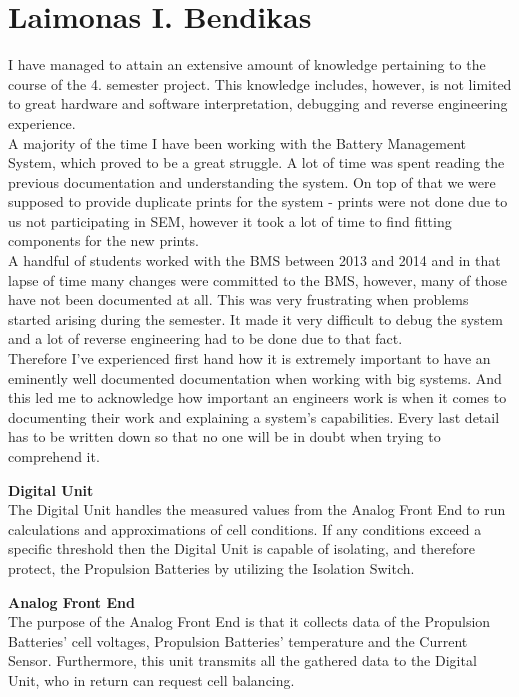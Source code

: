\section{Laimonas I. Bendikas}
I have managed to attain an extensive amount of knowledge pertaining to the course of the 4. semester project. This knowledge includes, however, is not limited to great hardware and software interpretation, debugging and reverse engineering experience.\\
A majority of the time I have been working with the Battery Management System, which proved to be a great struggle. A lot of time was spent reading the previous documentation and understanding the system. On top of that we were supposed to provide duplicate prints for the system - prints were not done due to us not participating in SEM, however it took a lot of time to find fitting components for the new prints.\\
A handful of students worked with the BMS between 2013 and 2014 and in that lapse of time many changes were committed to the BMS, however, many of those have not been documented at all. This was very frustrating when problems started arising during the semester. It made it very difficult to debug the system and a lot of reverse engineering had to be done due to that fact.\\
Therefore I've experienced first hand how it is extremely important to have an eminently well documented documentation when working with big systems. And this led me to acknowledge how important an engineers work is when it comes to documenting their work and explaining a system's capabilities. Every last detail has to be written down so that no one will be in doubt when trying to comprehend it. 

\textbf{Digital Unit}\\
The Digital Unit handles the measured values from the Analog Front End to run calculations and approximations of cell conditions. If any conditions exceed a specific threshold then the Digital Unit is capable of isolating, and therefore protect, the Propulsion Batteries by utilizing the Isolation Switch.

\textbf{Analog Front End}\\
The purpose of the Analog Front End is that it collects data of the Propulsion Batteries' cell voltages, Propulsion Batteries' temperature and the Current Sensor. Furthermore, this unit transmits all the gathered data to the Digital Unit, who in return can request cell balancing. 

